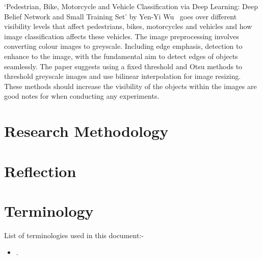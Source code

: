 \documentclass[12pt]{report} %
\begin{document}
		`Pedestrian, Bike, Motorcycle and Vehicle Classification via Deep Learning: Deep Belief Network and Small Training Set' by Yen-Yi Wu~\cite{wu_pedestrian_2016} goes over different visibility levels that affect pedestrians, bikes, motorcycles and vehicles and how image classification affects these vehicles. The image preprocessing involves converting colour images to greyscale. Including edge emphasis, detection to enhance to the image, with the fundamental aim to detect edges of objects seamlessly. The paper suggests using a fixed threshold and Otsu methods to threshold greyscale images and use bilinear interpolation for image resizing. These methods should increase the visibility of the objects within the images are good notes for when conducting any experiments.

\chapter{Research Methodology}
\label{chap:researchMethodology}

\chapter{Reflection}

\chapter{Terminology}
List of terminologies used in this document:-
\begin{itemize}
	\item .
\end{itemize}


\clearpage
\nocite{*}
\small{
	}


\end{document}
